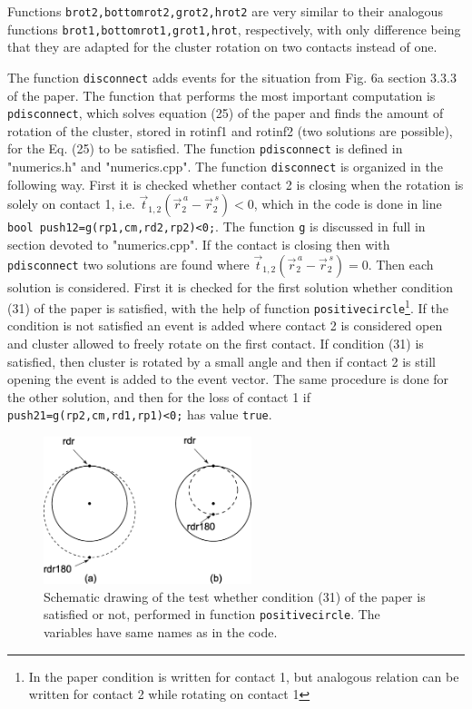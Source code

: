 \documentclass[12pt]{article}
\begin{document}
Functions \texttt{brot2,bottomrot2,grot2,hrot2} are very similar to their analogous functions \texttt{brot1,bottomrot1,grot1,hrot}, respectively, with only difference being that they are adapted for the cluster rotation on two contacts instead of one.

The function \texttt{disconnect} adds events for the situation from Fig. 6a section 3.3.3 of the paper. The function that performs the most important computation is \texttt{pdisconnect}, which solves equation (25) of the paper and finds the amount of rotation of the cluster, stored in rotinf1 and rotinf2 (two solutions are possible), for the Eq. (25) to be satisfied. The function \texttt{pdisconnect} is defined in "numerics.h" and "numerics.cpp". The function \texttt{disconnect} is organized in the following way. First it is checked whether contact 2 is closing when the rotation is solely on contact 1, i.e. $\vec{t}_{1,2}\left(\vec{r}^{\,a}_2-\vec{r}^{\,s}_2\right)<0$, which in the code is done in line \texttt{bool push12=g(rp1,cm,rd2,rp2)<0;}. The function \texttt{g} is discussed in full in section devoted to "numerics.cpp". If the contact is closing then with \texttt{pdisconnect} two solutions are found where $\vec{t}_{1,2}\left(\vec{r}^{\,a}_2-\vec{r}^{\,s}_2\right)=0$. Then each solution is considered. First it is checked for the first solution whether condition (31) of the paper is satisfied, with the help of function \texttt{positivecircle}\footnote{In the paper condition is written for contact 1, but analogous relation can be written for contact 2 while rotating on contact 1}. If the condition is not satisfied an event is added where contact 2 is considered open and cluster allowed to freely rotate on the first contact. If condition (31) is satisfied, then cluster is rotated by a small angle and then if contact 2 is still opening the event is added to the event vector. The same procedure is done for the other solution, and then for the loss of contact 1 if \texttt{push21=g(rp2,cm,rd1,rp1)<0;} has value \texttt{true}.
\begin{figure}[!htbh]
\begin{center}
\includegraphics[width=0.54\textwidth]{positive_circle.eps}
\caption{Schematic drawing of the test whether condition (31) of the paper is satisfied or not, performed in function \texttt{positivecircle}. The variables have same names as in the code.}
\label{positive}
\end{center}
\end{figure}
\end{document}
